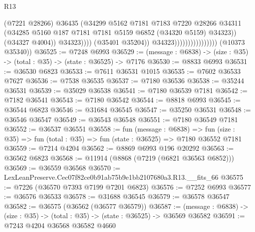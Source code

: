 \begin{lexlean}{R13}
\begin{coremodule}
                                                  (@7221 @28266)
                                                  @36435
                                                  (@34299
                                                    @5162
                                                    @7181
                                                    @7183
                                                    @7220
                                                    @28266
                                                    @34311
                                                    (@34285
                                                      @5160
                                                      @187
                                                      @7181
                                                      @7181
                                                      @5159
                                                      @6852
                                                      (@34320 @5159)
                                                      @34323))
                                                  (@34327 @4004))
                                                @34323))))
                                        (@35401 @35204))
                                      @34323))))))))))))))))
      (@10373 @35340))
@36525 := @7248 @6993
@36529 := (message : @6838) -> (size : @35) -> (total : @35) -> (state : @36525) -> @7176
@36530 := @8833 @6993
@36531 := @36530 @6823
@36533 := @7611 @36531 @1015
@36535 := @7602 @36533 @7627
@36536 := @7538 @36535
@36537 := @7180 @36536
@36538 := @35244 @36531
@36539 := @35029 @36538
@36541 := @7180 @36539 @7181
@36542 := @7182 @36541
@36543 := @7180 @36542
@36544 := @8818 @6993
@36545 := @36544 @6823
@36546 := @31684 @36545
@36547 := @35250 @36531
@36548 := @36546 @36547
@36549 := @36543 @36548
@36551 := @7180 @36549 @7181
@36552 := @36537 @36551
@36558 := fun (message : @6838) =>
  fun (size : @35) => fun (total : @35) => fun (state : @36525) => @7180 @36552 @7181
@36559 := @7214 @4204
@36562 := @8869 @6993 @196 @20292
@36563 := @36562 @6823
@36568 := @11914 (@8868 (@7219 (@6821 @36563 @6852)))
@36569 := @36559 @36568
@36570 := LexLeanPreserve.Cec07f82ce0b91ab75b9e1bb2107680a3.R13.__fits_66
@36575 := @7226 (@36570 @7393 @7199 @7201 @6823)
@36576 := @7252 @6993
@36577 := @36576 @36533
@36578 := @31688 @36545
@36579 := @36578 @36547
@36582 := @36575 (@36562 (@36577 @36579))
@36587 := (message : @6838) -> (size : @35) -> (total : @35) -> (state : @36525) -> @36569 @36582
@36591 := @7243 @4204 @36568 @36582 @4660

\end{coremodule}
\end{lexlean}
